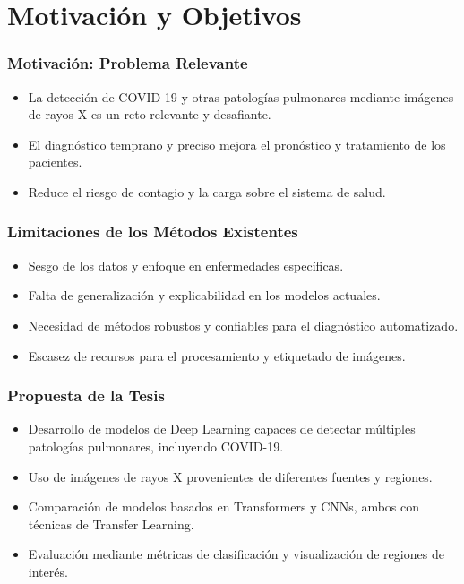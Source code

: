 
\section{Motivación y Objetivos}

\begin{frame}
\frametitle{Motivación: Problema Relevante}
\begin{itemize}
    \item La detección de COVID-19 y otras patologías pulmonares mediante imágenes de rayos X es un reto relevante y desafiante.
    \item El diagnóstico temprano y preciso mejora el pronóstico y tratamiento de los pacientes.
    \item Reduce el riesgo de contagio y la carga sobre el sistema de salud.
\end{itemize}
\end{frame}

\begin{frame}
\frametitle{Limitaciones de los Métodos Existentes}
\begin{itemize}
    \item Sesgo de los datos y enfoque en enfermedades específicas.
    \item Falta de generalización y explicabilidad en los modelos actuales.
    \item Necesidad de métodos robustos y confiables para el diagnóstico automatizado.
    \item Escasez de recursos para el procesamiento y etiquetado de imágenes.
\end{itemize}
\end{frame}

\begin{frame}
\frametitle{Propuesta de la Tesis}
\begin{itemize}
    \item Desarrollo de modelos de Deep Learning capaces de detectar múltiples patologías pulmonares, incluyendo COVID-19.
    \item Uso de imágenes de rayos X provenientes de diferentes fuentes y regiones.
    \item Comparación de modelos basados en Transformers y CNNs, ambos con técnicas de Transfer Learning.
    \item Evaluación mediante métricas de clasificación y visualización de regiones de interés.
\end{itemize}
\end{frame}

